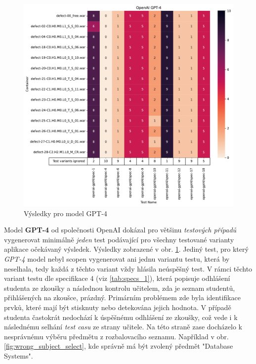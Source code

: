 \documentclass[czech, ma, kiv, he, iso690alph, pdf, viewonly]{fasthesis}
\begin{document}
            \begin{figure}
                \includegraphics[width=\textwidth]{pic/gpt-4-results.pdf}
                \caption{Výsledky pro model GPT-4}
                \label{fig:res:gpt-4}
            \end{figure}

            Model \textbf{GPT-4} od společnosti OpenAI dokázal pro většinu \textit{testových případů} vygenerovat minimálně \emph{jeden} test podávající pro všechny testované varianty aplikace očekávaný výsledek. Výsledky zobrazené v obr. \ref{fig:res:gpt-4}. Jediný test, pro který \textit{GPT-4} model nebyl scopen vygenerovat ani jednu variantu testu, která by neselhala, tedy každá z těchto variant vždy hlásila neúspěšný test. V rámci těchto variant testu dle specifikace 4 (viz \ref{tab:specs_1}), která popisuje odhlášení studenta ze zkoušky a následnou kontrolu učitelem, zda je seznam studentů, přihlášených na zkoušce, prázdný. Primárním problémem zde byla identifikace prvků, které mají být stisknuty nebo detekována jejich hodnota. V případě studenta častokrát nedochází k úspěšnému odhlášení ze zkoušky, což vede i k následnému selhání \textit{test casu} ze strany učitele. Na této straně zase docházelo k nesprávnému výběru předmětu z rozbalovacího seznamu. Například v obr. \ref{fig:wrong_subject_select}, kde správně má být zvolený předmět "Database Systems".
\end{document}

